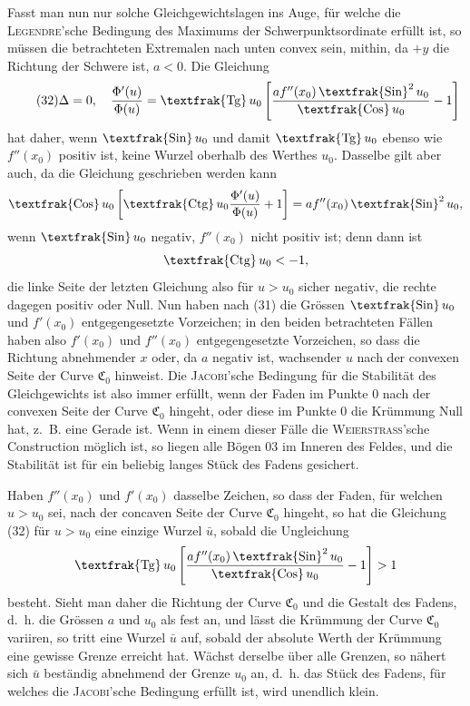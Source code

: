 \documentclass[11pt,a4paper,leqno]{article}
\newcommand{\Cof}{\mathop{\text{\textfrak{Cos}}}\nolimits}
\newcommand{\Sin}{\mathop{\text{\textfrak{Sin}}}\nolimits}
\newcommand{\Tg}{\mathop{\text{\textfrak{Tg}}}\nolimits}
\newcommand{\Ctg}{\mathop{\text{\textfrak{Ctg}}}\nolimits}
\begin{document}
Fasst man nun nur solche Gleichgewichtslagen ins Auge, für welche die \textsc{Legendre}'sche Bedingung des Maximums der Schwerpunktsordinate erfüllt ist, so müssen die betrachteten Extremalen nach unten convex sein, mithin, da $+y$ die Richtung der Schwere ist, $a<0$. Die Gleichung
\begin{equation}\tag{32}
\Delta=0,
\quad
\frac{\Phi'(u)}{\Phi(u)}=\Tg u_0\left[\frac{a f''(x_0)\Sin^2u_0}{\Cof u_0}-1\right]
\end{equation}
hat daher, wenn $\Sin u_0$ und damit $\Tg u_0$ ebenso wie $f''(x_0)$ positiv ist, keine Wurzel oberhalb des Werthes $u_0$. Dasselbe gilt aber auch, da die Gleichung geschrieben werden kann
\[
\Cof u_0\left[\Ctg u_0\frac{\Phi'(u)}{\Phi(u)}+1\right]=a f''(x_0)\Sin^2u_0,
\]
wenn $\Sin u_0$ negativ, $f''(x_0)$ nicht positiv ist; denn dann ist
\[
\Ctg u_0<-1,
\]
die linke Seite der letzten Gleichung also für $u>u_0$ sicher negativ, die rechte dagegen positiv oder Null. Nun haben nach (31) die Grössen $\Sin u_0$ und $f'(x_0)$ entgegengesetzte Vorzeichen; in den beiden betrachteten Fällen haben also $f'(x_0)$ und $f''(x_0)$ entgegengesetzte Vorzeichen, so dass die Richtung abnehmender $x$ oder, da $a$ negativ ist, wachsender $u$ nach der convexen Seite der Curve $\mathfrak{C}_0$ hinweist. Die \textsc{Jacobi}'sche Bedingung für die Stabilität des Gleichgewichts ist also immer erfüllt, wenn der Faden im Punkte 0 nach der convexen Seite der Curve $\mathfrak{C}_0$ hingeht, oder diese im Punkte 0 die Krümmung Null hat, z.~B. eine Gerade ist. Wenn in einem dieser Fälle die \textsc{Weierstrass}'sche
Construction möglich ist, so liegen alle Bögen 03 im Inneren des Feldes, und die Stabilität ist für ein beliebig langes Stück des Fadens gesichert.

Haben $f''(x_0)$ und $f'(x_0)$ dasselbe Zeichen, so dass der Faden, für welchen $u>u_0$ sei, nach der concaven Seite der Curve $\mathfrak{C}_0$ hingeht, so hat die Gleichung (32) für $u>u_0$ eine einzige Wurzel $\bar u$, sobald die Ungleichung
\[
\Tg u_0\left[\frac{a f''(x_0)\Sin^2u_0}{\Cof u_0}-1\right]>1
\]
besteht. Sieht man daher die Richtung der Curve $\mathfrak{C}_0$ und die Gestalt des Fadens, d.~h. die Grössen $a$ und $u_0$ als fest an, und lässt die Krümmung der Curve $\mathfrak{C}_0$ variiren, so tritt eine Wurzel $\bar u$ auf, sobald der absolute Werth der Krümmung eine gewisse Grenze erreicht hat. Wächst derselbe über alle Grenzen, so nähert sich $\bar u$ beständig abnehmend der Grenze $u_0$ an, d.~h. das Stück des Fadens, für welches die \textsc{Jacobi}'sche Bedingung erfüllt ist, wird unendlich klein.
\end{document}
